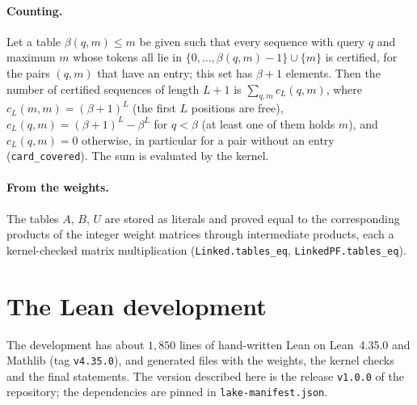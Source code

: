 \documentclass[11pt,a4paper]{article}
\newcommand{\lean}[1]{\texttt{#1}}
\begin{document}
\paragraph{Counting.}
Let a table $\beta(q,m)\le m$ be given such that every sequence with query $q$
and maximum $m$ whose tokens all lie in $\{0,\dots,\beta(q,m)-1\}\cup\{m\}$ is
certified, for the pairs $(q,m)$ that have an entry; this set has $\beta+1$
elements. Then the number of certified sequences of length $L+1$ is
$\sum_{q,m}c_L(q,m)$, where $c_L(m,m)=(\beta+1)^L$ (the first $L$ positions are
free), $c_L(q,m)=(\beta+1)^L-\beta^L$ for $q<\beta$ (at least one of them holds
$m$), and $c_L(q,m)=0$ otherwise, in particular for a pair without an entry
(\lean{card\_covered}). The sum is evaluated by the kernel.

\paragraph{From the weights.}
The tables $A$, $B$, $U$ are stored as literals and proved equal to the
corresponding products of the integer weight matrices through intermediate
products, each a kernel-checked matrix multiplication
(\lean{Linked.tables\_eq}, \lean{LinkedPF.tables\_eq}).

\section{The Lean development}\label{app:lean}

The development has about $1{,}850$ lines of hand-written Lean on Lean~4.35.0
and Mathlib (tag \lean{v4.35.0}), and generated files with the weights, the
kernel checks and the final statements. The version described here is the
release \lean{v1.0.0} of the repository; the dependencies are pinned in
\lean{lake-manifest.json}.
\end{document}
